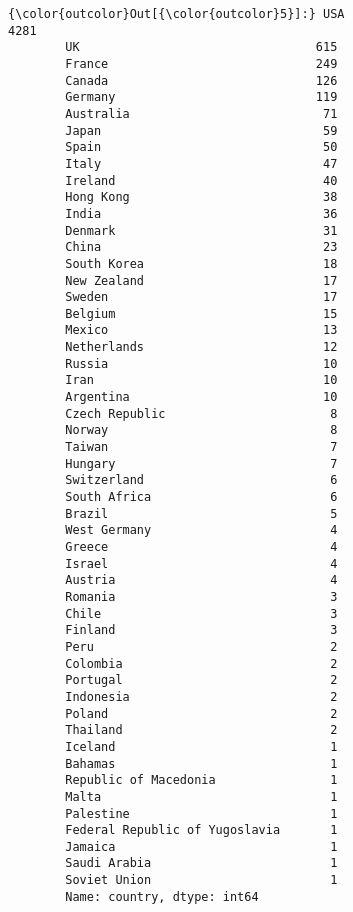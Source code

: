 \documentclass[11pt]{article}
\begin{document}
\begin{Verbatim}[commandchars=\\\{\}]
{\color{outcolor}Out[{\color{outcolor}5}]:} USA                               4281
        UK                                 615
        France                             249
        Canada                             126
        Germany                            119
        Australia                           71
        Japan                               59
        Spain                               50
        Italy                               47
        Ireland                             40
        Hong Kong                           38
        India                               36
        Denmark                             31
        China                               23
        South Korea                         18
        New Zealand                         17
        Sweden                              17
        Belgium                             15
        Mexico                              13
        Netherlands                         12
        Russia                              10
        Iran                                10
        Argentina                           10
        Czech Republic                       8
        Norway                               8
        Taiwan                               7
        Hungary                              7
        Switzerland                          6
        South Africa                         6
        Brazil                               5
        West Germany                         4
        Greece                               4
        Israel                               4
        Austria                              4
        Romania                              3
        Chile                                3
        Finland                              3
        Peru                                 2
        Colombia                             2
        Portugal                             2
        Indonesia                            2
        Poland                               2
        Thailand                             2
        Iceland                              1
        Bahamas                              1
        Republic of Macedonia                1
        Malta                                1
        Palestine                            1
        Federal Republic of Yugoslavia       1
        Jamaica                              1
        Saudi Arabia                         1
        Soviet Union                         1
        Name: country, dtype: int64
\end{Verbatim}
            
\end{document}

